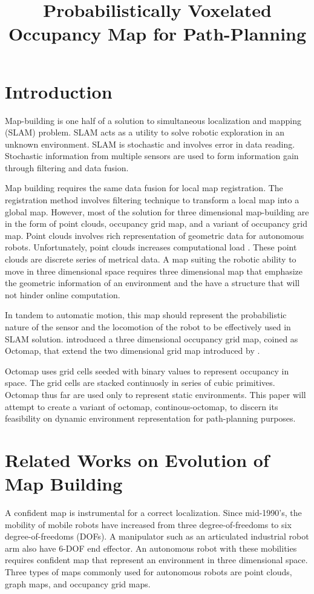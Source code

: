 \documentclass[a4paper,10pt]{article}
\title{Probabilistically Voxelated Occupancy Map for Path-Planning}
\author{}
\begin{document}
\maketitle

\section{Introduction}
Map-building is one half of a solution to simultaneous localization and mapping
(SLAM) problem. SLAM acts as a utility to solve robotic exploration in an unknown
environment. SLAM is stochastic and involves error in data reading. Stochastic
information from multiple sensors are used to form information gain through
filtering and data fusion. 

Map building requires the same data fusion for local
map registration. The registration method involves filtering technique to
transform a local map into a global map. However, most of the solution for three
dimensional map-building are in the form of point clouds, occupancy grid map,
and a variant of occupancy grid map. Point clouds involves
rich representation of geometric data for autonomous robots. Unfortunately, point
clouds increases computational
load \citep{Borrmann2008,Cole2006,Engelhard2011,Weingarten2005}. These point clouds are discrete series of metrical data. A
map suiting the robotic ability to move in three dimensional space requires
three dimensional map that emphasize the geometric information of an
environment and the have a structure that will not hinder online computation.

In tandem to automatic motion, this map should represent the probabilistic
nature of the sensor and the locomotion of the robot to be effectively used in
SLAM solution. \citet{Hornung2013} introduced a three dimensional occupancy grid
map, coined as Octomap, that extend the two dimensional grid map introduced by \citet{Elfes1989}.

Octomap uses grid cells seeded with binary values to represent occupancy in
space. The grid cells are stacked continuosly in series of cubic primitives.
Octomap thus far are used only to represent static environments. This paper will
attempt to create a variant of octomap, continous-octomap, to discern its
feasibility on dynamic environment representation for path-planning purposes. 

\section{Related Works on Evolution of Map Building}
A confident map is instrumental for a correct localization. Since mid-1990's, the
mobility of mobile robots have increased from three degree-of-freedoms to six
degree-of-freedoms (DOFs). A manipulator such as an articulated  industrial
robot arm also have 6-DOF end effector. An autonomous robot with these 
mobilities requires confident map that represent an environment in three 
dimensional space. Three types of 
maps commonly used for autonomous robots are point clouds, graph maps, and
occupancy grid maps. 
\end{document}
